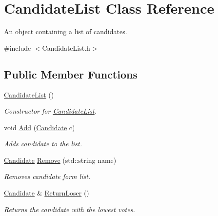 \hypertarget{class_candidate_list}{}\section{Candidate\+List Class Reference}
\label{class_candidate_list}


An object containing a list of candidates.  




{\ttfamily \#include $<$Candidate\+List.\+h$>$}

\subsection*{Public Member Functions}
\begin{DoxyCompactItemize}
\item 
\mbox{\label{class_candidate_list_a93e59d3b7c8f9cfc11f85eda636cd96d}} 
\mbox{\hyperlink{class_candidate_list_a93e59d3b7c8f9cfc11f85eda636cd96d}{Candidate\+List}} ()
\begin{DoxyCompactList}\small\item\em Constructor for \mbox{\hyperlink{class_candidate_list}{Candidate\+List}}. \end{DoxyCompactList}\item 
void \mbox{\hyperlink{class_candidate_list_a36a07e05ada013fdb02f5b81badc1cc3}{Add}} (\mbox{\hyperlink{class_candidate}{Candidate}} c)
\begin{DoxyCompactList}\small\item\em Adds candidate to the list. \end{DoxyCompactList}\item 
\mbox{\hyperlink{class_candidate}{Candidate}} \mbox{\hyperlink{class_candidate_list_a566cced2b1375525a5bc86686d0e4a7e}{Remove}} (std\+::string name)
\begin{DoxyCompactList}\small\item\em Removes candidate form list. \end{DoxyCompactList}\item 
\mbox{\label{class_candidate_list_ab86e3029ea749dae3646c3c491e9a628}} 
\mbox{\hyperlink{class_candidate}{Candidate}} \& \mbox{\hyperlink{class_candidate_list_ab86e3029ea749dae3646c3c491e9a628}{Return\+Loser}} ()
\begin{DoxyCompactList}\small\item\em Returns the candidate with the lowest votes. \end{DoxyCompactList}\item 

\end{DoxyCompactItemize}
